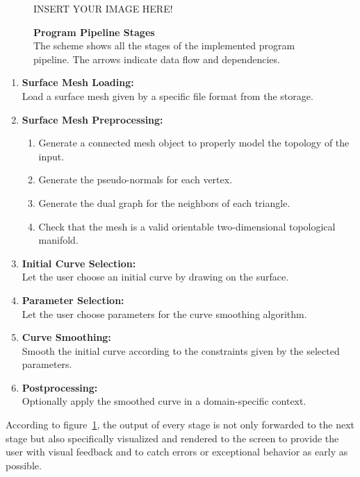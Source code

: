 \documentclass{stdlocal}
\begin{document}
  \begin{figure}[h]
    \begin{center}
      \large
      INSERT YOUR IMAGE HERE!
    \end{center}
    \caption[Program Pipeline Stages]{%
      \textbf{Program Pipeline Stages}\\
      The scheme shows all the stages of the implemented program pipeline.
      The arrows indicate data flow and dependencies.
    }
    \label{fig:program-pipeline}
  \end{figure}

  \begin{enumerate}
    \item \textbf{Surface Mesh Loading:}\\
      Load a surface mesh given by a specific file format from the storage.
    \item \textbf{Surface Mesh Preprocessing:}
      \begin{enumerate}
        \item Generate a connected mesh object to properly model the topology of the input.
        \item Generate the pseudo-normals for each vertex.
        \item Generate the dual graph for the neighbors of each triangle.
        \item Check that the mesh is a valid orientable two-dimensional topological manifold.
      \end{enumerate}
    \item \textbf{Initial Curve Selection:} \\
      Let the user choose an initial curve by drawing on the surface.
    \item \textbf{Parameter Selection:} \\
      Let the user choose parameters for the curve smoothing algorithm.
    \item \textbf{Curve Smoothing:} \\
      Smooth the initial curve according to the constraints given by the selected parameters.
    \item \textbf{Postprocessing:} \\
      Optionally apply the smoothed curve in a domain-specific context.
  \end{enumerate}
  According to figure~\ref{fig:program-pipeline}, the output of every stage is not only forwarded to the next stage but also specifically visualized and rendered to the screen to provide the user with visual feedback and to catch errors or exceptional behavior as early as possible.
\end{document}
